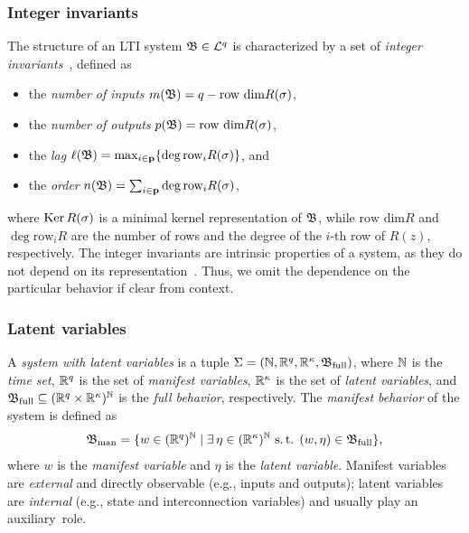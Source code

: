  \subsubsection{Integer invariants}
 The structure of an LTI  system ${\mathfrak{B} \in\mathcal{L}^q}$ is characterized by a set of \textit{integer invariants}~\cite{willems1986}, defined as
 \begin{itemize}
 \item the \textit{number of inputs} ${m(\mathfrak{B}) = q-\text{row dim} R(\sigma)}$,  
 \item the \textit{number of outputs} ${p(\mathfrak{B}) = \text{row dim} R(\sigma)}$,  
 \item the \textit{lag} ${\ell(\mathfrak{B}) = \max_{i \in\mathbf{p}}\{\deg\text{row}_i R(\sigma) \}}$, and
 \item the \textit{order} ${n(\mathfrak{B})=\sum_{i \in\mathbf{p}} \deg\text{row}_i R(\sigma) }$, %
 \end{itemize}
 where   
 $\operatorname{Ker} R(\sigma)$  is a minimal  kernel representation of $\mathfrak{B}$, while   
 ${\text{row dim}R}$ and ${\deg\text{row}_i R}$ are the number of rows and the degree of the $i$-th row of $R(z)$, respectively. The integer invariants are intrinsic properties of a system, as they do not depend on its representation~\cite{willems1986}. Thus, we omit the dependence on the particular behavior if clear from context.


 \subsubsection{Latent variables} 
 A \textit{system with latent variables} is a tuple $\Sigma = (\mathbb{N}, \mathbb{R}^q, \mathbb{R}^\kappa, \mathfrak{B}_{\textup{full}})$, where $\mathbb{N}$ is the \textit{time set}, $\mathbb{R}^q$ is the set of \textit{manifest variables}, $\mathbb{R}^\kappa$ is the set of \textit{latent variables}, and $\mathfrak{B}_{\textup{full}} \subseteq (\mathbb{R}^q \times \mathbb{R}^\kappa)^{\mathbb{N}}$ is the \textit{full behavior}, respectively. The \textit{manifest behavior} of the system is defined as
 \begin{equation}
 \mathfrak{B}_{\textup{man}} = \{ w \in (\mathbb{R}^q)^{\mathbb{N}} \mid \exists \, \eta\in(\mathbb{R}^\kappa)^{\mathbb{N}} \text{ s.\,t. } (w, \eta) \in \mathfrak{B}_{\textup{full}} \},
 \end{equation}
 where $w$ is the \textit{manifest variable} and $\eta$ is the \textit{latent variable}. Manifest variables are \textit{external} and directly observable (e.g., inputs and outputs); latent variables are \textit{internal} (e.g., state and interconnection variables) and usually play an auxiliary~role.


